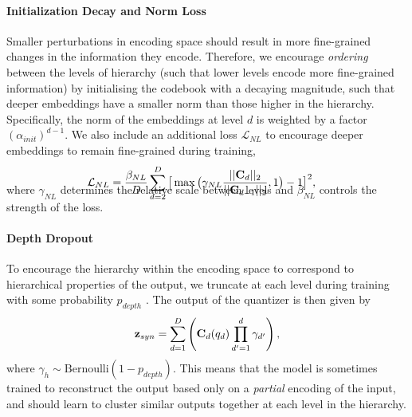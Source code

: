 \documentclass[11pt]{article}
\begin{document}
\paragraph{Initialization Decay and Norm Loss} Smaller perturbations in encoding space should result in more fine-grained changes in the information they encode. Therefore, we encourage \textit{ordering} between the levels of hierarchy (such that lower levels encode more fine-grained information) by initialising the codebook with a decaying magnitude, such that deeper embeddings have a smaller norm than those higher in the hierarchy. Specifically, the norm of the embeddings at level $d$ is weighted by a factor~$(\alpha_{init}) ^ {d-1}$. We also include an additional loss $\mathcal{L}_{NL}$ to encourage deeper embeddings to remain fine-grained during training, 
\begin{multline*}
\vspace{-.4cm}
\hspace{-.35cm}
    \mathcal{L}_{NL} = \frac{\beta_{NL}}{D} \sum \limits_{d=2}^{D} \big [ \max \big ( \gamma_{NL} \frac{ \lvert\lvert \textbf{C}_d \rvert\rvert_2 }{ \lvert\lvert \textbf{C}_{d-1} \rvert\rvert_2 } , 1\big ) - 1 \big ]^2,
\vspace{-.4cm}
\end{multline*}
where $\gamma_{NL}$ determines the relative scale between levels and $\beta_{NL}$ controls the strength of the loss.

\paragraph{Depth Dropout} To encourage the hierarchy within the encoding space to correspond to hierarchical properties of the output, we truncate at each level during training with some probability $p_{depth}$ \cite{hosking-etal-2022-hierarchical,10.1109/TASLP.2021.3129994}. The output of the quantizer is then given by 
\begin{align}
\vspace{-.4cm}
\textbf{z}_{syn} = \sum \limits_{d=1}^D \left ( \textbf{C}_d(q_d) \prod\limits_{d'=1}^d \gamma_{d'} \right ) ,
\vspace{-.4cm}
\end{align}
where $\gamma_h \sim \text{Bernoulli}(1 - p_{depth})$. This means that the model is sometimes trained to reconstruct the output based only on a \textit{partial} encoding of the input, and should learn to cluster similar outputs together at each level in the hierarchy.
\end{document}

